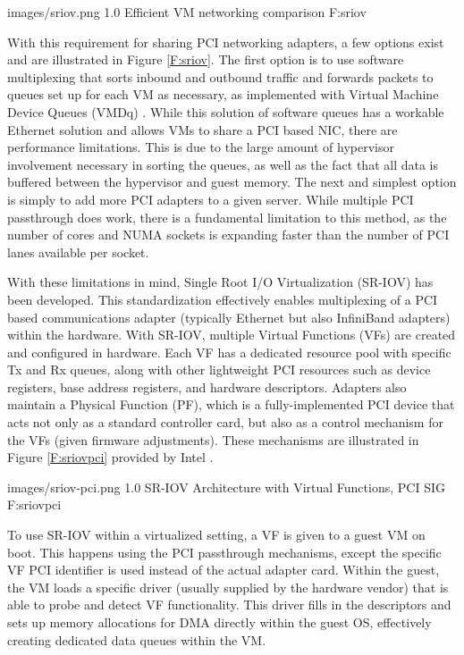   {images/sriov.png}
  {1.0}
  {Efficient VM networking comparison \cite{Musleh2014cloud}}
  {F:sriov}


With this requirement for sharing PCI networking adapters, a few options exist and are illustrated in Figure \ref{F:sriov}. The first option is to use software multiplexing that sorts inbound and outbound traffic and forwards packets to queues set up for each VM as necessary, as implemented with Virtual Machine Device Queues (VMDq) \cite{luo2010network}. While this solution of software queues has a workable Ethernet solution and allows VMs to share a PCI based NIC, there are performance limitations. This is due to the large amount of hypervisor involvement necessary in sorting the queues, as well as the fact that all data is buffered between the hypervisor and guest memory. The next and simplest option is simply to add more PCI adapters to a given server. While multiple PCI passthrough does work, there is a fundamental limitation to this method, as the number of cores and NUMA sockets is expanding faster than the number of PCI lanes available per socket. 

With these limitations in mind, Single Root I/O Virtualization (SR-IOV) has been developed. This standardization effectively enables multiplexing of a PCI based communications adapter (typically Ethernet but also InfiniBand adapters) within the hardware.  With SR-IOV, multiple Virtual Functions (VFs) are created and configured in hardware.  Each VF has a dedicated resource pool with specific Tx and Rx queues, along with other lightweight PCI resources such as device registers, base address registers, and hardware descriptors.  Adapters also maintain a Physical Function (PF), which is a fully-implemented PCI device that acts not only as a standard controller card, but also as a control mechanism for the VFs (given firmware adjustments). These mechanisms are illustrated in Figure \ref{F:sriovpci} provided by Intel \cite{kutch2011pci}. 
 
  {images/sriov-pci.png}
  {1.0}
  {SR-IOV Architecture with Virtual Functions, PCI SIG \cite{kutch2011pci}}
  {F:sriovpci}

To use SR-IOV within a virtualized setting, a VF is given to a guest VM on boot. This happens using the PCI passthrough mechanisms, except the specific VF PCI identifier is used instead of the actual adapter card. Within the guest, the VM loads a specific driver (usually supplied by the hardware vendor) that is able to probe and detect VF functionality. This driver fills in the descriptors and sets up memory allocations for DMA directly within the guest OS, effectively creating dedicated data queues within the VM.  

